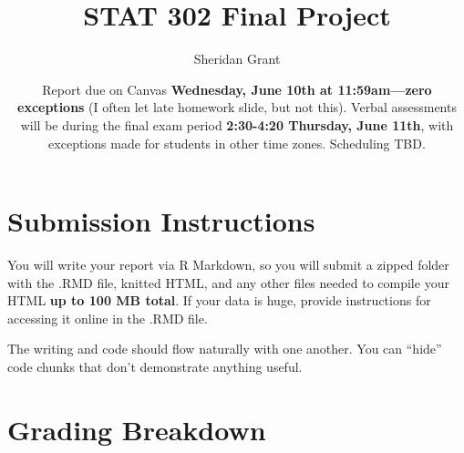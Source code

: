 \documentclass[12pt]{article}
\title{STAT 302 Final Project}
\author{Sheridan Grant}
\date{Report due on Canvas \textbf{Wednesday, June 10th at 11:59am---zero exceptions} (I often let late homework slide, but not this). Verbal assessments will be during the final exam period \textbf{2:30-4:20 Thursday, June 11th}, with exceptions made for students in other time zones. Scheduling TBD.}
\begin{document}
\sloppy

\maketitle

\section*{Submission Instructions}

You will write your report via R Markdown, so you will submit a zipped folder with the .RMD file, knitted HTML, and any other files needed to compile your HTML \textbf{up to 100 MB total}. If your data is huge, provide instructions for accessing it online in the .RMD file.

The writing and code should flow naturally with one another. You can ``hide'' code chunks that don't demonstrate anything useful.

\section*{Grading Breakdown}
\end{document}
